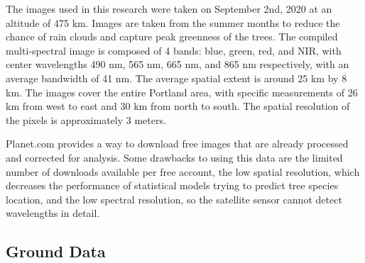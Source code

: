 \documentclass[12pt,twoside]{reedthesis}
\begin{document}
The images used in this research were taken on September 2nd, 2020 at an altitude of 475 km. Images are taken from the summer months to reduce the chance of rain clouds and capture peak greenness of the trees. The compiled multi-spectral image is composed of 4 bands: blue, green, red, and NIR, with center wavelengths 490 nm, 565 nm, 665 nm, and 865 nm respectively, with an average bandwidth of 41 nm. The average spatial extent is around 25 km by 8 km. The images cover the entire Portland area, with specific measurements of 26 km from west to east and 30 km from north to south. The spatial resolution of the pixels is approximately 3 meters.

Planet.com provides a way to download free images that are already processed and corrected for analysis. Some drawbacks to using this data are the limited number of downloads available per free account, the low spatial resolution, which decreases the performance of statistical models trying to predict tree species location, and the low spectral resolution, so the satellite sensor cannot detect wavelengths in detail.

\hypertarget{ground-data}{%
\subsection{Ground Data}\label{ground-data}}
\end{document}
